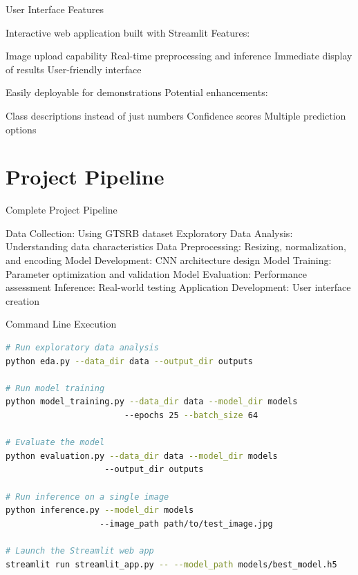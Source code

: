 \documentclass{beamer}
\begin{document}
\begin{frame}{User Interface Features}
\begin{itemize}
    Interactive web application built with Streamlit
    Features:
    \begin{itemize}
        Image upload capability
        Real-time preprocessing and inference
        Immediate display of results
        User-friendly interface
    \end{itemize}
    Easily deployable for demonstrations
    Potential enhancements:
    \begin{itemize}
        Class descriptions instead of just numbers
        Confidence scores
        Multiple prediction options
    \end{itemize}
\end{itemize}
\end{frame}

\section{Project Pipeline}

\begin{frame}{Complete Project Pipeline}
\begin{itemize}
    {Data Collection}: Using GTSRB dataset
    {Exploratory Data Analysis}: Understanding data characteristics
    {Data Preprocessing}: Resizing, normalization, and encoding
    {Model Development}: CNN architecture design
    {Model Training}: Parameter optimization and validation
    {Model Evaluation}: Performance assessment
    {Inference}: Real-world testing
    {Application Development}: User interface creation
\end{itemize}
\end{frame}

\begin{frame}{Command Line Execution}
\begin{lstlisting}[language=bash]
# Run exploratory data analysis
python eda.py --data_dir data --output_dir outputs

# Run model training
python model_training.py --data_dir data --model_dir models 
                        --epochs 25 --batch_size 64

# Evaluate the model
python evaluation.py --data_dir data --model_dir models 
                    --output_dir outputs

# Run inference on a single image
python inference.py --model_dir models 
                   --image_path path/to/test_image.jpg

# Launch the Streamlit web app
streamlit run streamlit_app.py -- --model_path models/best_model.h5
\end{lstlisting}
\end{frame}
\end{document}

